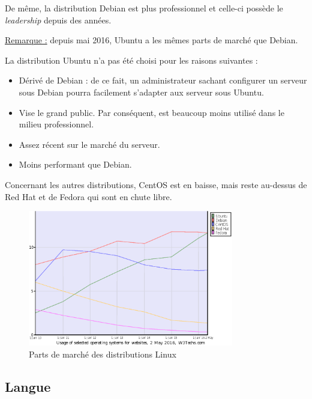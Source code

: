 \newpage

De même, la distribution Debian est plus professionnel et celle-ci possède le
\textit{leadership} depuis des années.

\underline{Remarque :} depuis mai 2016, Ubuntu a les mêmes parts de marché que
Debian.

La distribution Ubuntu n'a pas été choisi pour les raisons suivantes :
\begin{itemize}
\item Dérivé de Debian : de ce fait, un administrateur sachant configurer un
serveur sous Debian pourra facilement s'adapter aux serveur sous Ubuntu.

\item Vise le grand public. Par conséquent, est beaucoup moins utilisé dans le
milieu professionnel.

\item Assez récent sur le marché du serveur.

\item Moins performant que Debian.
\end{itemize}

Concernant les autres distributions, CentOS est en baisse, mais reste au-dessus
de Red Hat et de Fedora qui sont en chute libre.

\begin{figure}[h]
  \centering
  \includegraphics[width=0.8\textwidth]
  {textures/images/installation/distributions.eps}
  \caption{Parts de marché des distributions Linux}
\end{figure}

\newpage

\subsection{Langue}
\label{subsec:langue}

